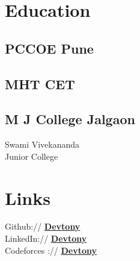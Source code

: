 \documentclass[]{deedy-resume-openfont}
\begin{document}
%
%
\lastupdated

%
%

%
%

\begin{minipage}[t]{0.33\textwidth} 


\section{Education} 

\subsection{PCCOE Pune}
\sectionsep

\subsection{MHT CET}
\sectionsep

\subsection{M J College Jalgaon}
Swami Vivekananda \\
Junior College\\

\sectionsep




\section{Links} 
Github:// \href{https://github.com/gittonyp}{\bf Devtony} \\
LinkedIn://  \href{ https://www.linkedin.com/in/gittonyp}{\bf Devtony} \\
Codeforces ://  \href{https://codeforces.com/profile/devtony}{\bf Devtony} \\



\end{minipage}
\end{document}
